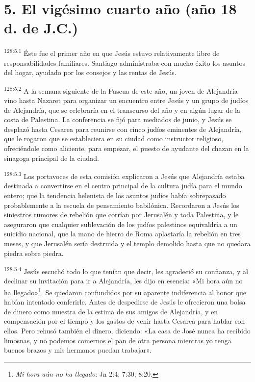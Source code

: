 \section*{5. El vigésimo cuarto año (año 18 d. de J.C.)}
\par
\textsuperscript{128:5.1} Éste fue el primer año en que Jesús estuvo relativamente libre de responsabilidades familiares. Santiago administraba con mucho éxito los asuntos del hogar, ayudado por los consejos y las rentas de Jesús.

\par
\textsuperscript{128:5.2} A la semana siguiente de la Pascua de este año, un joven de Alejandría vino hasta Nazaret para organizar un encuentro entre Jesús y un grupo de judíos de Alejandría, que se celebraría en el transcurso del año y en algún lugar de la costa de Palestina. La conferencia se fijó para mediados de junio, y Jesús se desplazó hasta Cesarea para reunirse con cinco judíos eminentes de Alejandría, que le rogaron que se estableciera en su ciudad como instructor religioso, ofreciéndole como aliciente, para empezar, el puesto de ayudante del chazan en la sinagoga principal de la ciudad.

\par
\textsuperscript{128:5.3} Los portavoces de esta comisión explicaron a Jesús que Alejandría estaba destinada a convertirse en el centro principal de la cultura judía para el mundo entero; que la tendencia helenista de los asuntos judíos había sobrepasado probablemente a la escuela de pensamiento babilónica. Recordaron a Jesús los siniestros rumores de rebelión que corrían por Jerusalén y toda Palestina, y le aseguraron que cualquier sublevación de los judíos palestinos equivaldría a un suicidio nacional, que la mano de hierro de Roma aplastaría la rebelión en tres meses, y que Jerusalén sería destruida y el templo demolido hasta que no quedara piedra sobre piedra.

\par
\textsuperscript{128:5.4} Jesús escuchó todo lo que tenían que decir, les agradeció su confianza, y al declinar su invitación para ir a Alejandría, les dijo en esencia: «Mi hora aún no ha llegado»\footnote{\textit{Mi hora aún no ha llegado}: Jn 2:4; 7:30; 8:20.}. Se quedaron confundidos por su aparente indiferencia al honor que habían intentado conferirle. Antes de despedirse de Jesús le ofrecieron una bolsa de dinero como muestra de la estima de sus amigos de Alejandría, y en compensación por el tiempo y los gastos de venir hasta Cesarea para hablar con ellos. Pero rehusó también el dinero, diciendo: «La casa de José nunca ha recibido limosnas, y no podemos comernos el pan de otra persona mientras yo tenga buenos brazos y mis hermanos puedan trabajar».

